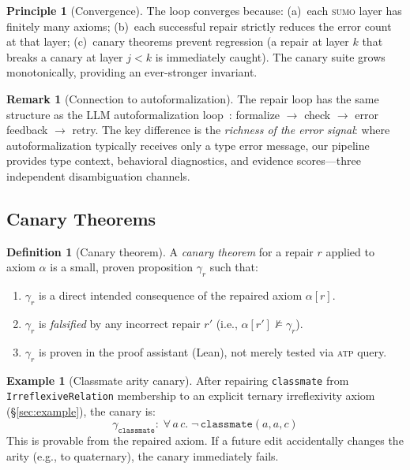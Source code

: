 \documentclass[11pt]{article}
\newcommand{\SUMO}{\textsc{sumo}}
\newcommand{\ATP}{\textsc{atp}}
\theoremstyle{definition}
\newtheorem{definition}{Definition}[section]
\newtheorem{remark}{Remark}[section]
\newtheorem{example}{Example}[section]
\newtheorem{principle}{Principle}[section]
\theoremstyle{plain}
\begin{document}
\begin{principle}[Convergence]
The loop converges because: (a)~each \SUMO{} layer has finitely many
axioms; (b)~each successful repair strictly reduces the error count at
that layer; (c)~canary theorems prevent regression (a repair at layer
$k$ that breaks a canary at layer $j < k$ is immediately caught).
The canary suite grows monotonically, providing an ever-stronger
invariant.
\end{principle}

\begin{remark}[Connection to autoformalization]
The repair loop has the same structure as the LLM autoformalization
loop~\cite{autoformalization-survey}: formalize $\to$ check $\to$
error feedback $\to$ retry.  The key difference is the \emph{richness
of the error signal}: where autoformalization typically receives only
a type error message, our pipeline provides type context, behavioral
diagnostics, and evidence scores---three independent disambiguation
channels.
\end{remark}

\subsection{Canary Theorems}
\label{sec:canary}

\begin{definition}[Canary theorem]
\label{def:canary}
A \emph{canary theorem} for a repair $r$ applied to axiom $\alpha$ is
a small, proven proposition $\gamma_r$ such that:
\begin{enumerate}[nosep]
  \item $\gamma_r$ is a direct intended consequence of the repaired
    axiom $\alpha[r]$.
  \item $\gamma_r$ is \emph{falsified} by any incorrect repair $r'$
    (i.e., $\alpha[r'] \not\models \gamma_r$).
  \item $\gamma_r$ is proven in the proof assistant (Lean), not merely
    tested via \ATP{} query.
\end{enumerate}
\end{definition}

\begin{example}[Classmate arity canary]
After repairing \texttt{classmate} from
\texttt{IrreflexiveRelation} membership to an explicit ternary
irreflexivity axiom (\S\ref{sec:example}), the canary is:
\[
  \gamma_{\texttt{classmate}} :\;
  \forall\, a\, c.\; \neg\,\texttt{classmate}(a, a, c)
\]
This is provable from the repaired axiom.  If a future edit
accidentally changes the arity (e.g., to quaternary), the canary
immediately fails.
\end{example}
\end{document}
